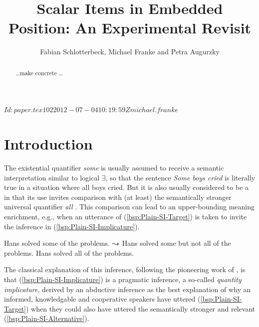 \documentclass[fleqn,reqno,10pt,draft]{article}
\title{Scalar Items in Embedded Position: {A}n Experimental Revisit}
\author{Fabian Schlotterbeck, Michael Franke and Petra Augurzky}
\date{}
\begin{document}
\maketitle



\begin{abstract}
  \dots make concrete \dots
\end{abstract}

\tableofcontents

\svnInfo $Id: paper.tex 102 2012-07-04 10:19:59Z michael.franke $

\section{Introduction}
\label{sec:introduction}

The existential quantifier \emph{some} is usually assumed to receive a
semantic interpretation similar to logical $\exists$, so that the
sentence \emph{Some boys cried} is literally true in a situation where
all boys cried. But it is also usually considered to be a
 in that its use invites comparison with (at
least) the semantically stronger universal quantifier \emph{all}
\citep[c.f.][]{Horn1972:On-the-Semantic,Gazdar1979:Pragmatics:-Imp,AtlasLevinson1981}. This
comparison can lead to an upper-bounding meaning enrichment, e.g.,
when an utterance of (\ref{bsp:Plain-SI-Target}) is taken to invite
the inference in (\ref{bsp:Plain-SI-Implicature}).

\begin{exe}
  \ex \label{bsp:Plain-SI}
    \begin{xlist}
      \ex \label{bsp:Plain-SI-Target} Hans solved some of the
        problems.
      \ex \label{bsp:Plain-SI-Implicature} $\leadsto$ Hans solved
        some but not all of the problems.
      \ex \label{bsp:Plain-SI-Alternative} Hans solved all of the problems.
    \end{xlist}
\end{exe}

\noindent The classical explanation of this inference, following the
pioneering work of \citet{Grice1975:Logic-and-Conve} \citep[see][for
recent overview]{Geurts2010:Quantity-Implic}, is that
(\ref{bsp:Plain-SI-Implicature}) is a pragmatic inference, a so-called
\emph{quantity implicature}, derived by an abductive inference as the
best explanation of why an informed, knowledgable and cooperative
speakers have uttered (\ref{bsp:Plain-SI-Target}) when they could also
have uttered the semantically stronger and relevant
(\ref{bsp:Plain-SI-Alternative}).
\end{document}
